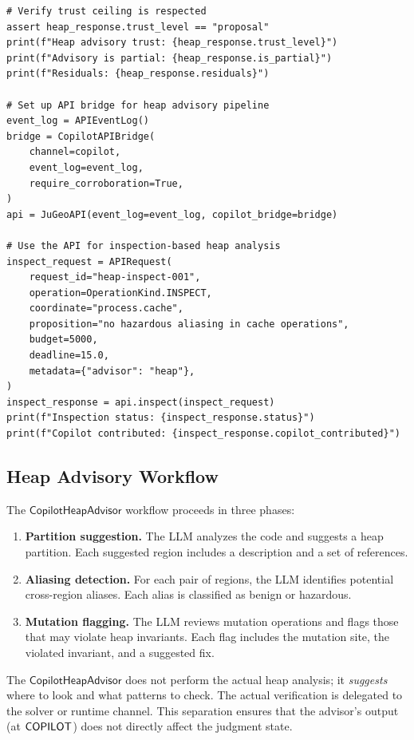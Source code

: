 \documentclass[11pt]{article}
\newcommand{\HeapAdv}{\mathsf{CopilotHeapAdvisor}}
\begin{document}
\begin{lstlisting}[style=jugeo-python, caption={CopilotChannel for heap analysis advisory.}, label=lst:heap-query]
# Verify trust ceiling is respected
assert heap_response.trust_level == "proposal"
print(f"Heap advisory trust: {heap_response.trust_level}")
print(f"Advisory is partial: {heap_response.is_partial}")
print(f"Residuals: {heap_response.residuals}")

# Set up API bridge for heap advisory pipeline
event_log = APIEventLog()
bridge = CopilotAPIBridge(
    channel=copilot,
    event_log=event_log,
    require_corroboration=True,
)
api = JuGeoAPI(event_log=event_log, copilot_bridge=bridge)

# Use the API for inspection-based heap analysis
inspect_request = APIRequest(
    request_id="heap-inspect-001",
    operation=OperationKind.INSPECT,
    coordinate="process.cache",
    proposition="no hazardous aliasing in cache operations",
    budget=5000,
    deadline=15.0,
    metadata={"advisor": "heap"},
)
inspect_response = api.inspect(inspect_request)
print(f"Inspection status: {inspect_response.status}")
print(f"Copilot contributed: {inspect_response.copilot_contributed}")
\end{lstlisting}

\subsection{Heap Advisory Workflow}
\label{sec:heap:workflow}

The $\HeapAdv$ workflow proceeds in three phases:

\begin{enumerate}
\item \textbf{Partition suggestion.}  The LLM analyzes the code
  and suggests a heap partition.  Each suggested region includes
  a description and a set of references.

\item \textbf{Aliasing detection.}  For each pair of regions,
  the LLM identifies potential cross-region aliases.  Each alias
  is classified as benign or hazardous.

\item \textbf{Mutation flagging.}  The LLM reviews mutation
  operations and flags those that may violate heap invariants.
  Each flag includes the mutation site, the violated invariant,
  and a suggested fix.
\end{enumerate}

\begin{remark}
\label{rem:heap-scope}
The $\HeapAdv$ does not perform the actual heap analysis; it
\emph{suggests} where to look and what patterns to check.  The
actual verification is delegated to the solver or runtime channel.
This separation ensures that the advisor's output (at $\mathsf{COPILOT}$)
does not directly affect the judgment state.
\end{remark}
\end{document}
